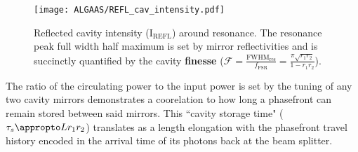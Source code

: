 \begin{figure}[H]
\texttt{[image: ALGAAS/REFL\_cav\_intensity.pdf]}
\caption{Reflected cavity intensity (I$_\mathrm{REFL}$) around resonance. The resonance peak full width half maximum is set by mirror reflectivities and is succinctly quantified by the cavity \textbf{finesse} ($\mathscr{F} = \frac{\mathrm{FWHM}_\mathrm{res}}{f_\mathrm{FSR}} = \frac{\pi \sqrt{r_1 r_2}}{1-r_1 r_2}$).}
\label{fig:cav_length_response_DCpow}
\end{figure}

The ratio of the circulating power to the input power is set by the tuning of any two cavity mirrors demonstrates a coorelation to how long a phasefront can remain stored between said mirrors. This ``cavity storage time" ($\tau_s \appropto L r_1 r_2$) translates as a length elongation with the phasefront travel history encoded in the arrival time of its photons back at the beam splitter.

